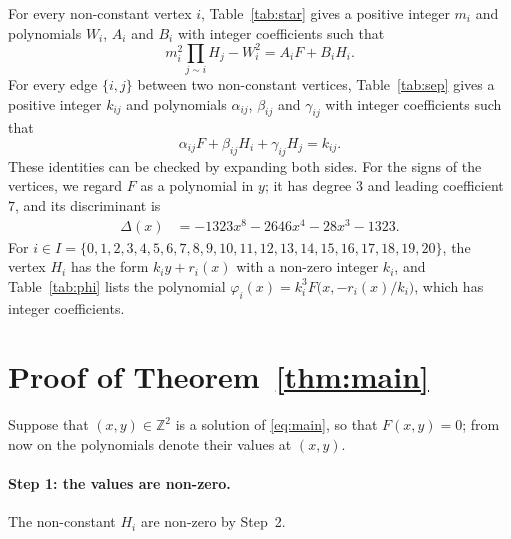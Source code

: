 \documentclass[11pt]{article}
\newcommand{\Z}{\mathbb{Z}}
\begin{document}
For every non-constant vertex $i$, Table~\ref{tab:star} gives a positive integer $m_{i}$ and polynomials $W_{i}$, $A_{i}$ and $B_{i}$ with integer coefficients such that
\begin{equation}\label{eq:star}
m_i^2\prod_{j\sim i}H_j-W_i^2=A_iF+B_iH_i.
\end{equation}
For every edge $\{i,j\}$ between two non-constant vertices, Table~\ref{tab:sep} gives a positive integer $k_{ij}$ and polynomials $\alpha_{ij}$, $\beta_{ij}$ and $\gamma_{ij}$ with integer coefficients such that
\begin{equation}\label{eq:sep}
\alpha_{ij}F+\beta_{ij}H_i+\gamma_{ij}H_j=k_{ij}.
\end{equation}
These identities can be checked by expanding both sides.
For the signs of the vertices, we regard $F$ as a polynomial in $y$; it has degree $3$ and leading coefficient $7$, and its discriminant is
\begin{align*}
\Delta(x)&=-1323x^{8}-2646x^{4}-28x^{3}-1323.
\end{align*}
For $i\in I=\{0,\allowbreak 1,\allowbreak 2,\allowbreak 3,\allowbreak 4,\allowbreak 5,\allowbreak 6,\allowbreak 7,\allowbreak 8,\allowbreak 9,\allowbreak 10,\allowbreak 11,\allowbreak 12,\allowbreak 13,\allowbreak 14,\allowbreak 15,\allowbreak 16,\allowbreak 17,\allowbreak 18,\allowbreak 19,\allowbreak 20\}$, the vertex $H_i$ has the form $k_iy+r_i(x)$ with a non-zero integer $k_i$, and Table~\ref{tab:phi} lists the polynomial $\varphi_i(x)=k_i^3F\bigl(x,-r_i(x)/k_i\bigr)$, which has integer coefficients.

\section{Proof of Theorem~\ref{thm:main}}

Suppose that $(x,y)\in\Z^2$ is a solution of \eqref{eq:main}, so that $F(x,y)=0$; from now on the polynomials denote their values at $(x,y)$.
\paragraph{Step 1: the values are non-zero.} The non-constant $H_i$ are non-zero by Step~2.
\end{document}
